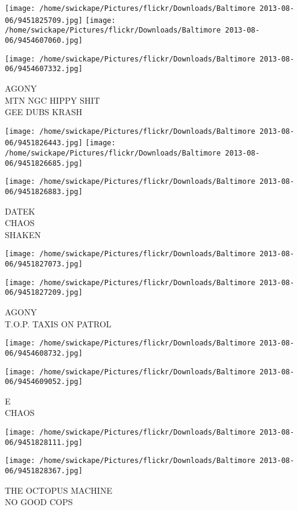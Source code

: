 \documentclass[10pt,letterpaper]{article}
\begin{document}
\texttt{[image: /home/swickape/Pictures/flickr/Downloads/Baltimore 2013-08-06/9451825709.jpg]}
\texttt{[image: /home/swickape/Pictures/flickr/Downloads/Baltimore 2013-08-06/9454607060.jpg]}

\vspace{0.25in}
\texttt{[image: /home/swickape/Pictures/flickr/Downloads/Baltimore 2013-08-06/9454607332.jpg]}

AGONY\\
MTN NGC HIPPY SHIT\\
GEE DUBS KRASH
\pagebreak

\texttt{[image: /home/swickape/Pictures/flickr/Downloads/Baltimore 2013-08-06/9451826443.jpg]}
\texttt{[image: /home/swickape/Pictures/flickr/Downloads/Baltimore 2013-08-06/9451826685.jpg]}

\texttt{[image: /home/swickape/Pictures/flickr/Downloads/Baltimore 2013-08-06/9451826883.jpg]}

DATEK\\
CHAOS\\
SHAKEN
\pagebreak

\texttt{[image: /home/swickape/Pictures/flickr/Downloads/Baltimore 2013-08-06/9451827073.jpg]}

\vspace{0.25in}
\texttt{[image: /home/swickape/Pictures/flickr/Downloads/Baltimore 2013-08-06/9451827209.jpg]}

AGONY\\
T.O.P. TAXIS ON PATROL
\pagebreak

\texttt{[image: /home/swickape/Pictures/flickr/Downloads/Baltimore 2013-08-06/9454608732.jpg]}

\vspace{0.25in}
\texttt{[image: /home/swickape/Pictures/flickr/Downloads/Baltimore 2013-08-06/9454609052.jpg]}

E\\
CHAOS
\pagebreak

\texttt{[image: /home/swickape/Pictures/flickr/Downloads/Baltimore 2013-08-06/9451828111.jpg]}

\vspace{0.25in}
\texttt{[image: /home/swickape/Pictures/flickr/Downloads/Baltimore 2013-08-06/9451828367.jpg]}

THE OCTOPUS MACHINE\\
NO GOOD COPS
\pagebreak
\end{document}
